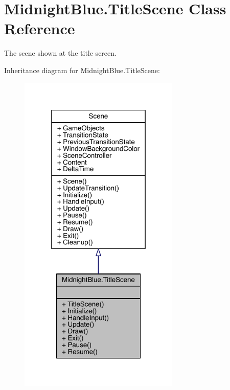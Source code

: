 \hypertarget{class_midnight_blue_1_1_title_scene}{}\section{Midnight\+Blue.\+Title\+Scene Class Reference}
\label{class_midnight_blue_1_1_title_scene}


The scene shown at the title screen.  




Inheritance diagram for Midnight\+Blue.\+Title\+Scene\+:
\nopagebreak
\begin{figure}[H]
\begin{center}
\leavevmode
\includegraphics[width=217pt]{class_midnight_blue_1_1_title_scene__inherit__graph}
\end{center}
\end{figure}


